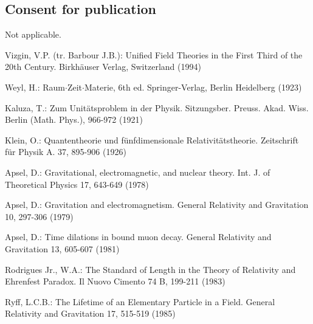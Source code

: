 \subsection*{Consent for publication}
Not applicable.


\begin{thebibliography}{}

Vizgin, V.P. (tr. Barbour J.B.):
Unified Field Theories in the First Third of the 20th Century.
Birkh\"{a}user Verlag, Switzerland (1994)

Weyl, H.:
Raum$\cdot$Zeit$\cdot$Materie, 6th ed.
Springer-Verlag, Berlin Heidelberg (1923)


Kaluza, T.:
Zum Unit\"{a}tsproblem in der Physik.
Sitzungsber. Preuss. Akad. Wiss. Berlin (Math. Phys.), 966-972 (1921)
 
Klein, O.:
Quantentheorie und f\"{u}nfdimensionale Relativit\"{a}tstheorie.
Zeitschrift f\"{u}r Physik A. 37, 895-906 (1926)

Apsel, D.:
Gravitational, electromagnetic, and nuclear theory.
Int. J.  of Theoretical Physics 17, 643-649 (1978)

Apsel, D.:
Gravitation and electromagnetism.
General Relativity and Gravitation 10, 297-306 (1979)

Apsel, D.:
Time dilations in bound muon decay.
General Relativity and Gravitation 13, 605-607 (1981)

Rodrigues Jr., W.A.:
The Standard of Length in the Theory of Relativity and Ehrenfest Paradox.
Il Nuovo Cimento 74 B, 199-211 (1983)

Ryff, L.C.B.:
The Lifetime of an Elementary Particle in a Field.
General Relativity and Gravitation 17, 515-519 (1985)


\end{thebibliography}
